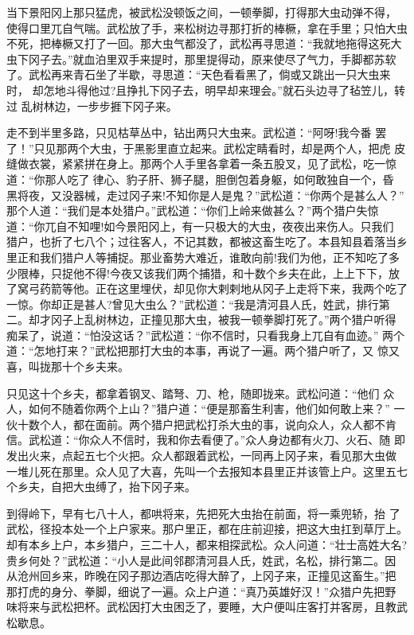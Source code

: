 当下景阳冈上那只猛虎，被武松没顿饭之间，一顿拳脚，打得那大虫动弹不得，
使得口里兀自气喘。武松放了手，来松树边寻那打折的棒橛，拿在手里；只怕大虫
不死，把棒橛又打了一回。那大虫气都没了，武松再寻思道：“我就地拖得这死大
虫下冈子去。”就血泊里双手来提时，那里提得动，原来使尽了气力，手脚都苏软
了。武松再来青石坐了半歇，寻思道：“天色看看黑了，倘或又跳出一只大虫来时，
却怎地斗得他过?且挣扎下冈子去，明早却来理会。”就石头边寻了毡笠儿，转过
乱树林边，一步步捱下冈子来。

走不到半里多路，只见枯草丛中，钻出两只大虫来。武松道：“阿呀!我今番
罢了！”只见那两个大虫，于黑影里直立起来。武松定睛看时，却是两个人，把虎
皮缝做衣裳，紧紧拼在身上。那两个人手里各拿着一条五股叉，见了武松，吃一惊
道：“你那人吃了律心、豹子肝、狮子腿，胆倒包着身躯，如何敢独自一个，昏
黑将夜，又没器械，走过冈子来!不知你是人是鬼？”武松道：“你两个是甚么人？”
那个人道：“我们是本处猎户。”武松道：“你们上岭来做甚么？”两个猎户失惊
道：“你兀自不知哩!如今景阳冈上，有一只极大的大虫，夜夜出来伤人。只我们
猎户，也折了七八个；过往客人，不记其数，都被这畜生吃了。本县知县着落当乡
里正和我们猎户人等捕捉。那业畜势大难近，谁敢向前!我们为他，正不知吃了多
少限棒，只捉他不得!今夜又该我们两个捕猎，和十数个乡夫在此，上上下下，放
了窝弓药箭等他。正在这里埋伏，却见你大剌剌地从冈子上走将下来，我两个吃了
一惊。你却正是甚人?曾见大虫么？”武松道：“我是清河县人氏，姓武，排行第
二。却才冈子上乱树林边，正撞见那大虫，被我一顿拳脚打死了。”两个猎户听得
痴呆了，说道：“怕没这话？”武松道：“你不信时，只看我身上兀自有血迹。”
两个道：“怎地打来？”武松把那打大虫的本事，再说了一遍。两个猎户听了，又
惊又喜，叫拢那十个乡夫来。

只见这十个乡夫，都拿着钢叉、踏弩、刀、枪，随即拢来。武松问道：“他们
众人，如何不随着你两个上山？”猎户道：“便是那畜生利害，他们如何敢上来？”
一伙十数个人，都在面前。两个猎户把武松打杀大虫的事，说向众人，众人都不肯
信。武松道：“你众人不信时，我和你去看便了。”众人身边都有火刀、火石、随
即发出火来，点起五七个火把。众人都跟着武松，一同再上冈子来，看见那大虫做
一堆儿死在那里。众人见了大喜，先叫一个去报知本县里正并该管上户。这里五七
个乡夫，自把大虫缚了，抬下冈子来。

到得岭下，早有七八十人，都哄将来，先把死大虫抬在前面，将一乘兜轿，抬
了武松，径投本处一个上户家来。那户里正，都在庄前迎接，把这大虫扛到草厅上。
却有本乡上户，本乡猎户，三二十人，都来相探武松。众人问道：“壮士高姓大名?
贵乡何处？”武松道：“小人是此间邻郡清河县人氏，姓武，名松，排行第二。因
从沧州回乡来，昨晚在冈子那边酒店吃得大醉了，上冈子来，正撞见这畜生。”把
那打虎的身分、拳脚，细说了一遍。众上户道：“真乃英雄好汉！”众猎户先把野
味将来与武松把杯。武松因打大虫困乏了，要睡，大户便叫庄客打并客房，且教武
松歇息。

